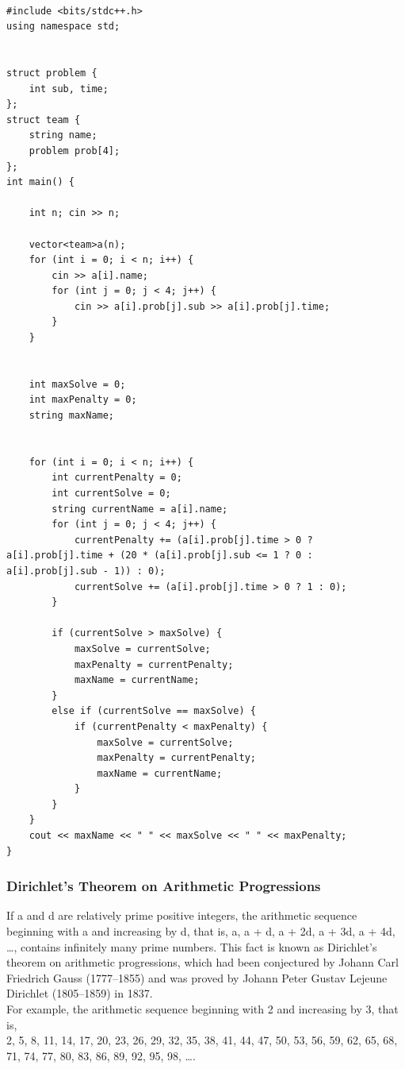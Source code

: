 \documentclass{article}
\begin{document}
\begin{lstlisting}

#include <bits/stdc++.h>
using namespace std;
	

struct problem {
	int sub, time;
};
struct team {
	string name;
	problem prob[4];
};
int main() {
	
	int n; cin >> n;

	vector<team>a(n);
	for (int i = 0; i < n; i++) {
		cin >> a[i].name;
		for (int j = 0; j < 4; j++) {
			cin >> a[i].prob[j].sub >> a[i].prob[j].time;
		}
	}


	int maxSolve = 0;
	int maxPenalty = 0;
	string maxName;


	for (int i = 0; i < n; i++) {
		int currentPenalty = 0;
		int currentSolve = 0;
		string currentName = a[i].name;
		for (int j = 0; j < 4; j++) {
			currentPenalty += (a[i].prob[j].time > 0 ? a[i].prob[j].time + (20 * (a[i].prob[j].sub <= 1 ? 0 : a[i].prob[j].sub - 1)) : 0);
			currentSolve += (a[i].prob[j].time > 0 ? 1 : 0);
		}

		if (currentSolve > maxSolve) {
			maxSolve = currentSolve;
			maxPenalty = currentPenalty;
			maxName = currentName;
		}
		else if (currentSolve == maxSolve) {
			if (currentPenalty < maxPenalty) {
				maxSolve = currentSolve;
				maxPenalty = currentPenalty;
				maxName = currentName;
			}
		}
	}
	cout << maxName << " " << maxSolve << " " << maxPenalty;
}

\end{lstlisting}


\subsubsection{Dirichlet’s Theorem on Arithmetic Progressions}

If a and d are relatively prime positive integers, the arithmetic sequence beginning with a and increasing by d, that is, a, a +  d, a + 2d, a + 3d, a + 4d, …, contains infinitely many prime numbers. This fact is known as Dirichlet’s theorem on arithmetic progressions, which had been conjectured by Johann Carl Friedrich Gauss (1777–1855) and was proved by Johann Peter Gustav Lejeune Dirichlet (1805–1859) in 1837. \\

For example, the arithmetic sequence beginning with 2 and increasing by 3, that is, \\ 2, 5, 8, 11, 14, 17, 20, 23, 26, 29, 32, 35, 38, 41, 44, 47, 50, 53, 56, 59, 62, 65, 68, 71, 74, 77, 80, 83, 86, 89, 92, 95, 98, …. \\
\end{document}
